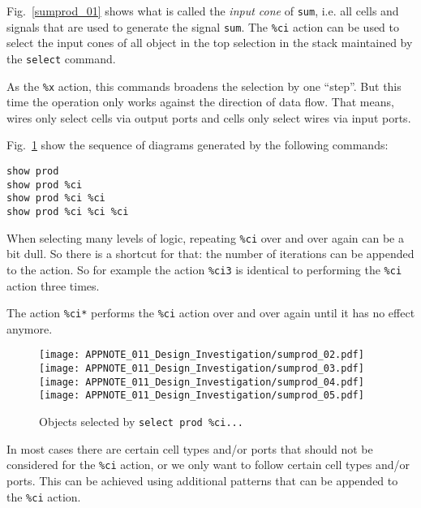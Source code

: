\documentclass[9pt,technote,a4paper]{IEEEtran}
\begin{document}
Fig.~\ref{sumprod_01} shows what is called the {\it input cone\/} of {\tt sum}, i.e.
all cells and signals that are used to generate the signal {\tt sum}. The {\tt \%ci}
action can be used to select the input cones of all object in the top selection
in the stack maintained by the {\tt select} command.

As the {\tt \%x} action, this commands broadens the selection by one ``step''. But
this time the operation only works against the direction of data flow. That means,
wires only select cells via output ports and cells only select wires via input ports.

Fig.~\ref{select_prod} show the sequence of diagrams generated by the following
commands:

\begin{verbatim}
show prod
show prod %ci
show prod %ci %ci
show prod %ci %ci %ci
\end{verbatim}

When selecting many levels of logic, repeating {\tt \%ci} over and over again
can be a bit dull. So there is a shortcut for that: the number of iterations
can be appended to the action. So for example the action {\tt \%ci3} is
identical to performing the {\tt \%ci} action three times.

The action {\tt \%ci*} performs the {\tt \%ci} action over and over again until
it has no effect anymore.

\begin{figure}[t]
\hfill \texttt{[image: APPNOTE\_011\_Design\_Investigation/sumprod\_02.pdf]} \\
\texttt{[image: APPNOTE\_011\_Design\_Investigation/sumprod\_03.pdf]} \\
\texttt{[image: APPNOTE\_011\_Design\_Investigation/sumprod\_04.pdf]} \\
\texttt{[image: APPNOTE\_011\_Design\_Investigation/sumprod\_05.pdf]} \\
\caption{Objects selected by {\tt select prod \%ci...}}
\label{select_prod}
\end{figure}

\medskip

In most cases there are certain cell types and/or ports that should not be considered for the {\tt \%ci}
action, or we only want to follow certain cell types and/or ports. This can be achieved using additional
patterns that can be appended to the {\tt \%ci} action.
\end{document}
